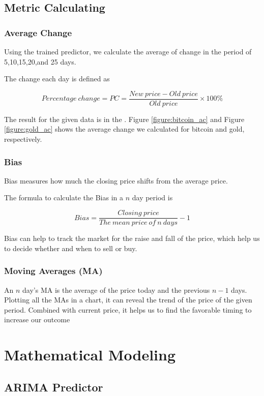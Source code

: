 \documentclass[12pt,a4paper]{article}
\newcommand{\Predictor}{ARIMA }
\begin{document}
\begin{spacing}{1.2}
\subsection{Metric Calculating}

\subsubsection{Average Change}

Using the trained predictor, we calculate the average of change in the period of 5,10,15,20,and 25 days.

The change each day is defined as

$$
Percentage \ change = PC = \frac{New \ price-Old \ price}{Old \ price} \times 100\%
$$


The result for the given data is in the . Figure \ref{figure:bitcoin_ac} and Figure \ref{figure:gold_ac} shows the average change we calculated for bitcoin and gold, respectively.


\subsubsection{Bias}

Bias measures how much the closing price shifts from the average price.

The formula to calculate the Bias in a $n$ day period is

$$
Bias = \frac{Closing \ price}{The \ mean \ price \ of \ n \ days} - 1
$$

Bias can help to track the market for the raise and fall of the price, which help us to decide whether and when to sell or buy.

\subsubsection{Moving Averages (MA)}

An $n$ day's MA is the average of the price today and the previous $n-1$ days. Plotting all the MAs in a chart, it can reveal the trend of the price of the given period. Combined with current price, it helps us to find the favorable timing to increase our outcome

\section{Mathematical Modeling}
\label{MathModels}

\subsection{\Predictor Predictor}


\end{spacing}
\end{document}

